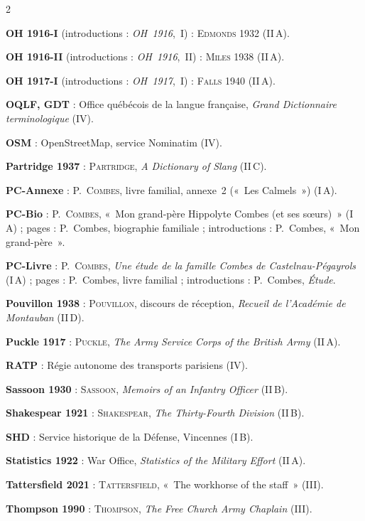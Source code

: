 \begin{multicols}{2}
\begin{biblist}
\item \textbf{OH 1916-I} (introductions : \textit{OH~1916},~I) : \textsc{Edmonds} 1932 (II\,A).
\item \textbf{OH 1916-II} (introductions : \textit{OH~1916},~II) : \textsc{Miles} 1938 (II\,A).
\item \textbf{OH 1917-I} (introductions : \textit{OH~1917},~I) : \textsc{Falls} 1940 (II\,A).
\item \textbf{OQLF, GDT} : Office québécois de la langue française, \textit{Grand Dictionnaire terminologique} (IV).
\item \textbf{OSM} : OpenStreetMap, service Nominatim (IV).
\item \textbf{Partridge 1937} : \textsc{Partridge}, \textit{A Dictionary of Slang} (II\,C).
\item \textbf{PC-Annexe} : P.~\textsc{Combes}, livre familial, annexe~2 («~Les Calmels~») (I\,A).
\item \textbf{PC-Bio} : P.~\textsc{Combes}, «~Mon grand-père Hippolyte Combes (et ses sœurs)~» (I\,A) ; pages : P.~Combes, biographie familiale ; introductions : P.~Combes, «~Mon grand-père~».
\item \textbf{PC-Livre} : P.~\textsc{Combes}, \textit{Une étude de la famille Combes de Castelnau-Pégayrols} (I\,A) ; pages : P.~Combes, livre familial ; introductions : P.~Combes, \textit{Étude}.
\item \textbf{Pouvillon 1938} : \textsc{Pouvillon}, discours de réception, \textit{Recueil de l'Académie de Montauban} (II\,D).
\item \textbf{Puckle 1917} : \textsc{Puckle}, \textit{The Army Service Corps of the British Army} (II\,A).
\item \textbf{RATP} : Régie autonome des transports parisiens (IV).
\item \textbf{Sassoon 1930} : \textsc{Sassoon}, \textit{Memoirs of an Infantry Officer} (II\,B).
\item \textbf{Shakespear 1921} : \textsc{Shakespear}, \textit{The Thirty-Fourth Division} (II\,B).
\item \textbf{SHD} : Service historique de la Défense, Vincennes (I\,B).
\item \textbf{Statistics 1922} : War Office, \textit{Statistics of the Military Effort} (II\,A).
\item \textbf{Tattersfield 2021} : \textsc{Tattersfield}, «~The workhorse of the staff~» (III).
\item \textbf{Thompson 1990} : \textsc{Thompson}, \textit{The Free Church Army Chaplain} (III).

\end{biblist}
\end{multicols}
